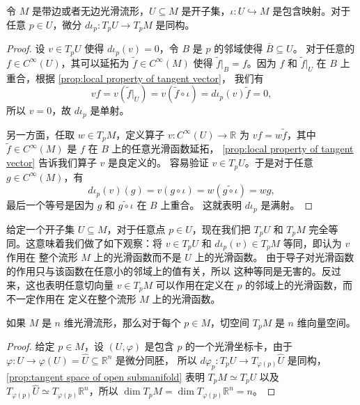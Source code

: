 \documentclass[fontset=none]{Notes}
\begin{document}
\begin{proposition}[开子流形的切空间]\label{prop:tangent space of open submanifold}
  令 $M$ 是带边或者无边光滑流形，$U\subseteq M$ 是开子集，$\iota:U\hookrightarrow M$
  是包含映射。对于任意 $p\in U$，微分 $d\iota_p:T_pU\to T_pM$ 是同构。
\end{proposition}
\begin{proof}
  设 $v\in T_pU$ 使得 $d\iota_p(v)=0$，令 $B$ 是 $p$ 的邻域使得 $\bar B\subseteq U$。
  对于任意的 $f\in C^\infty(U)$，其可以延拓为 $\tilde{f}\in C^\infty(M)$ 使得
  $\tilde{f}\big|_B=f$。因为 $f$ 和 $\tilde{f}\big|_U$ 在 $B$ 上重合，根据 \autoref{prop:local property of tangent vector}，
  我们有
  \[
    vf=v\left(\tilde{f}\big|_U\right)=v\left(\tilde{f}\circ\iota\right)=
    d\iota_p(v)\tilde{f}=0,
  \]
  所以 $v=0$，故 $d\iota_p$ 是单射。

  另一方面，任取 $w\in T_pM$，定义算子 $v:C^\infty(U)\to\mathbb{R}$ 为
  $vf=w\tilde{f}$，其中 $\tilde{f}\in C^\infty(M)$ 是 $f$ 在 $B$ 上的任意光滑函数延拓，
  \autoref{prop:local property of tangent vector} 告诉我们算子 $v$ 是良定义的。
  容易验证 $v\in T_pU$。于是对于任意 $g\in C^\infty(M)$，有
  \[
    d\iota_p(v)(g)=v(g\circ\iota)=w\left(\widetilde{g\circ\iota}\right) 
    =wg,
  \]
  最后一个等号是因为 $g$ 和 $\widetilde{g\circ\iota}$ 在 $B$ 上重合。
  这就表明 $d\iota_p$ 是满射。
\end{proof}

给定一个开子集 $U\subseteq M$，对于任意点 $p\in U$，现在我们把
$T_pU$ 和 $T_pM$ 完全等同。这意味着我们做了如下观察：将 
$v\in T_pU$ 和 $d\iota_p(v)\in T_pM$ 等同，即认为 $v$ 作用在
整个流形 $M$ 上的光滑函数而不是 $U$ 上的光滑函数。
由于导子对光滑函数的作用只与该函数在任意小的邻域上的值有关，所以
这种等同是无害的。反过来，这也表明任意切向量 $v\in T_pM$
可以作用在定义在 $p$ 的邻域上的光滑函数，而不一定作用在
定义在整个流形 $M$ 上的光滑函数。

\begin{proposition}[切空间的维数]
  如果 $M$ 是 $n$ 维光滑流形，那么对于每个 $p\in M$，切空间 $T_pM$
  是 $n$ 维向量空间。
\end{proposition}
\begin{proof}
  给定 $p\in M$，设 $(U,\varphi)$ 是包含 $p$ 的一个光滑坐标卡，由于
  $\varphi:U\to\varphi(U)=\hat U\subseteq\mathbb{R}^n$ 是微分同胚，
  所以 $d\varphi_p:T_pU\to T_{\varphi(p)}\hat U$ 是同构，
  \autoref{prop:tangent space of open submanifold} 表明 $T_p M\simeq T_pU$
  以及 $T_{\varphi(p)}\hat U\simeq T_{\varphi(p)}\mathbb{R}^n$，所以
  $\dim T_pM=\dim T_{\varphi(p)}\mathbb{R}^n=n$。
\end{proof}
\end{document}
